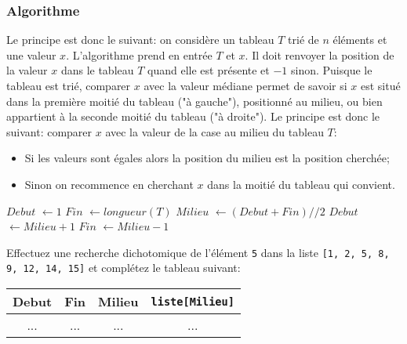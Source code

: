 \documentclass[12pt]{article}
\begin{document}
	\subsubsection*{Algorithme}	
	Le principe est donc le suivant: on considère un tableau $T$ trié de $n$ éléments et une valeur $x$. L’algorithme prend en entrée $T$ et $x$. Il doit renvoyer la position de la valeur $x$ dans le tableau $T$ quand elle est présente et $-1$ sinon. Puisque le tableau est trié, comparer $x$ avec la valeur médiane permet de savoir si $x$ est situé dans la première moitié du tableau ("à gauche"), positionné au milieu, ou bien appartient à la seconde moitié du tableau ("à droite"). Le principe est donc le suivant: comparer $x$ avec la valeur de la case au milieu du tableau $T$:
	
	\begin{itemize}
		\item Si les valeurs sont égales alors la position du milieu est la position cherchée;
		\item Sinon on recommence en cherchant $x$ dans la moitié du tableau qui convient.
	\end{itemize}
	
	
	\begin{MaReponse}
		\begin{algorithmic}[1]
			\State $Debut$ $\leftarrow 1$
			\State $Fin$ $\leftarrow longueur(T)$
			\State $Milieu$ $\leftarrow (Debut + Fin) // 2$
			\State{}
			\State $Debut$ $\leftarrow Milieu + 1$
			\Else
			\State $Fin$ $\leftarrow Milieu - 1$
			\EndIf
			\EndWhile
			\State{}
			\EndFunction
		\end{algorithmic}
	\end{MaReponse}
	
	\begin{MonExo}
		Effectuez une recherche dichotomique de l'élément \texttt{5} dans la liste \texttt{[1, 2, 5, 8, 9, 12, 14, 15]} et complétez le tableau suivant:
		
		\begin{tabular}{|c|c|c|c|}
			\hline
			\textbf{Debut} & \textbf{Fin} & \textbf{Milieu} & \textbf{\texttt{liste[Milieu]}}\\
			\hline
			... & ... & ... & ...\\
			\hline 
		\end{tabular}
	\end{MonExo}
	
\end{document}
